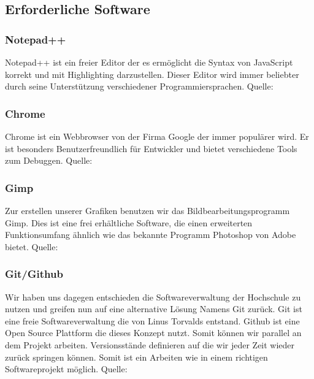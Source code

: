 \subsection{Erforderliche Software}
\subsubsection{Notepad++}
Notepad++ ist ein freier Editor der es ermöglicht die Syntax von JavaScript korrekt und mit Highlighting darzustellen. Dieser Editor wird immer beliebter durch seine Unterstützung verschiedener Programmiersprachen. Quelle: \cite{notepad}
\subsubsection{Chrome}
Chrome ist ein Webbrowser von der Firma Google der immer populärer wird. Er ist besonders Benutzerfreundlich für Entwickler und bietet verschiedene Tools zum Debuggen. Quelle: \cite{chrome}
\subsubsection{Gimp}
Zur erstellen unserer Grafiken benutzen wir das Bildbearbeitungsprogramm Gimp. Dies ist eine frei erhältliche Software, die einen erweiterten Funktionsumfang ähnlich wie das bekannte Programm Photoshop von Adobe bietet. Quelle: \cite{gimp}
\subsubsection{Git/Github}
Wir haben uns dagegen entschieden die Softwareverwaltung der Hochschule zu nutzen und greifen nun auf eine alternative Lösung Namens Git zurück. Git ist eine freie Softwareverwaltung die von Linus Torvalds entstand. Github ist eine Open Source Plattform die dieses Konzept nutzt. Somit können wir parallel an dem Projekt arbeiten. Versionsstände definieren auf die wir jeder Zeit wieder zurück springen können. Somit ist ein Arbeiten wie in einem richtigen Softwareprojekt möglich. Quelle: \cite{git}
